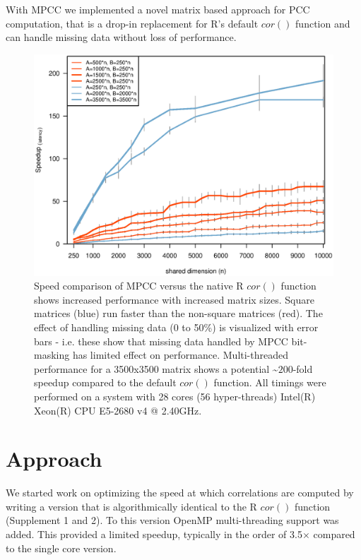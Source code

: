 \documentclass{bioinfo}
\begin{document}
With MPCC we implemented a novel matrix based approach for PCC 
computation, that is a drop-in replacement for R's default $cor()$ 
function and can handle missing data without loss of performance.
\vspace*{-4mm}

\begin{figure}[H]
\centering
\includegraphics[width=\linewidth]{img/figure02big.eps}
  \vspace{-8mm}
  \caption{ \small Speed comparison of MPCC versus the native R $cor()$
  function shows increased performance with increased matrix
  sizes. Square matrices (blue) run faster than the non-square
  matrices (red).  The effect of handling missing data (0 to 50\%) is
  visualized with error bars - i.e. these show that missing data
  handled by MPCC bit-masking has limited effect on performance.
  Multi-threaded performance for a 3500x3500 matrix shows a potential
   \textasciitilde{}$200$-fold speedup compared to the default $cor()$ function.  All
  timings were performed on a system with 28 cores (56 hyper-threads)
  Intel(R) Xeon(R) CPU E5-2680 v4 @ 2.40GHz.  } \label{fig:fig1}
\end{figure}

\vspace*{-12mm}

\section{Approach}

We started work on optimizing the speed at which correlations are computed 
by writing a version that is algorithmically identical to the R $cor()$ function
(Supplement 1 and 2). To this version OpenMP multi-threading support was added. 
This provided a limited speedup, typically in the order of
3.5$\times$ compared to the single core version. 
\end{document}
